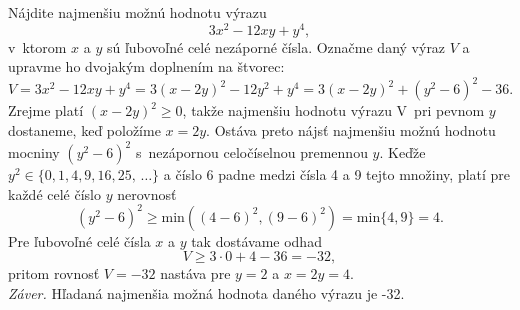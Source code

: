 
{Nájdite najmenšiu možnú hodnotu výrazu $$3x^2 - 12xy + y^4,$$
v~ktorom $x$ a $y$ sú ľubovoľné celé nezáporné čísla.
}{
\rieh Označme daný výraz $V$ a upravme ho dvojakým doplnením na štvorec: $$V = 3x^2 - 12xy + y^4= 3(x - 2y)^2 - 12y^2+ y^4= 3(x - 2y)^2+ (y^2 - 6)^2 - 36.$$
Zrejme platí $(x-2y)^2\geq0$, takže najmenšiu hodnotu výrazu V~pri pevnom $y$ dostaneme, keď položíme $x = 2y$. Ostáva preto nájsť najmenšiu možnú hodnotu mocniny $(y^2 - 6)^2$
s~nezápornou celočíselnou premennou $y$. Keďže $y^2 \in \{0, 1, 4, 9, 16, 25,\,\ldots\}$ a číslo 6 padne medzi čísla 4 a 9 tejto množiny, platí pre každé celé číslo $y$ nerovnosť $$(y^2 - 6)^
2\geq \mathrm{min} ((4 - 6)^2, (9 - 6)^2) = \mathrm{min}\{4, 9\} = 4.$$ Pre ľubovoľné celé čísla $x$ a $y$ tak dostávame odhad
$$V \geq 3 \cdot 0 + 4 - 36 = -32,$$
pritom rovnosť $V = -32$ nastáva pre $y = 2$ a $x = 2y = 4$.\\
\textit{Záver.} Hľadaná najmenšia možná hodnota daného výrazu je -32.\\
}